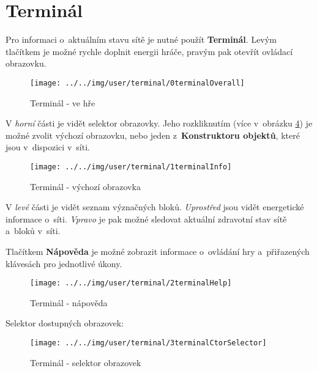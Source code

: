 
\section{Terminál}

Pro informaci o~aktuálním stavu sítě je nutné použít \textbf{Terminál}. Levým tlačítkem je možné rychle doplnit energii hráče, pravým pak otevřít ovládací obrazovku.

\begin{figure}[!ht]\centering
\texttt{[image: ../../img/user/terminal/0terminalOverall]}

\caption{Terminál - ve hře}
\label{fig:user_terminal_0terminalOverall}

\end{figure}

\FloatBarrier

V \textit{horní} části je vidět selektor obrazovky. Jeho rozkliknutím (více v~obrázku \ref{fig:user_terminal_3terminalCtorSelector}) je možné zvolit výchozí obrazovku, nebo jeden z~\textbf{Konstruktoru objektů}, které jsou v~dispozici v~síti.




\begin{figure}[!ht]\centering
\texttt{[image: ../../img/user/terminal/1terminalInfo]}

\caption{Terminál - výchozí obrazovka}
\label{fig:user_terminal_1terminalInfo}

\end{figure}

\FloatBarrier
V \textit{levé} části je vidět seznam význačných bloků. \textit{Uprostřed} jsou vidět energetické informace o~síti. \textit{Vpravo} je pak možné sledovat aktuální zdravotní stav sítě a~bloků v~síti.

Tlačítkem \textbf{Nápověda} je možné zobrazit informace o~ovládání hry a~přiřazených klávesách pro jednotlivé úkony.

\begin{figure}[!ht]\centering
\texttt{[image: ../../img/user/terminal/2terminalHelp]}

\caption{Terminál - nápověda}
\label{fig:user_terminal_2terminalHelp}

\end{figure}

\FloatBarrier

Selektor dostupných obrazovek:

\begin{figure}[!ht]\centering
\texttt{[image: ../../img/user/terminal/3terminalCtorSelector]}

\caption{Terminál - selektor obrazovek}
\label{fig:user_terminal_3terminalCtorSelector}

\end{figure}

